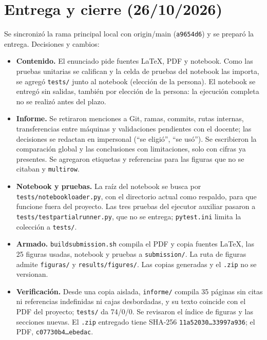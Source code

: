 \documentclass[11pt,letterpaper]{article}
\renewcommand{\_}{\originalunderscore\allowbreak}
\begin{document}
\section{Entrega y cierre (26/10/2026)}
Se sincronizó la rama principal local con origin/main (\texttt{a9654d6})
y se preparó la entrega. Decisiones y cambios:
\begin{itemize}
\item \textbf{Contenido.} El enunciado pide fuentes LaTeX, PDF y notebook.
Como las pruebas unitarias se califican y la celda de pruebas del notebook
las importa, se agregó \texttt{tests/} junto al notebook (elección de la
persona). El notebook se entregó sin salidas, también por elección de la
persona: la ejecución completa no se realizó antes del plazo.
\item \textbf{Informe.} Se retiraron menciones a Git, ramas, commits, rutas
internas, transferencias entre máquinas y validaciones pendientes con el
docente; las decisiones se redactan en impersonal (``se eligió'', ``se
usó''). Se escribieron la comparación global y las conclusiones con
limitaciones, solo con cifras ya presentes. Se agregaron etiquetas y
referencias para las figuras que no se citaban y \texttt{multirow}.
\item \textbf{Notebook y pruebas.} La raíz del notebook se busca por
\texttt{tests/notebook\_loader.py}, con el directorio actual como respaldo,
para que funcione fuera del proyecto. Las tres pruebas del ejecutor auxiliar
pasaron a \texttt{tests/test\_partial\_runner.py}, que no se entrega;
\texttt{pytest.ini} limita la colección a \texttt{tests/}.
\item \textbf{Armado.} \texttt{build\_submission.sh} compila el PDF y copia
fuentes LaTeX, las 25 figuras usadas, notebook y pruebas a
\texttt{submission/}. La ruta de figuras admite \texttt{figuras/} y
\texttt{results/figures/}. Las copias generadas y el \texttt{.zip} no se
versionan.
\item \textbf{Verificación.} Desde una copia aislada, \texttt{informe/}
compila 35 páginas sin citas ni referencias indefinidas ni cajas
desbordadas, y su texto coincide con el PDF del proyecto; \texttt{tests/}
da 74/0/0. Se revisaron el índice de figuras y las secciones nuevas. El
\texttt{.zip} entregado tiene SHA-256
\texttt{11a52030\ldots 33997a936}; el PDF, \texttt{c07730b4\ldots ebedac}.
\end{itemize}
\end{document}

